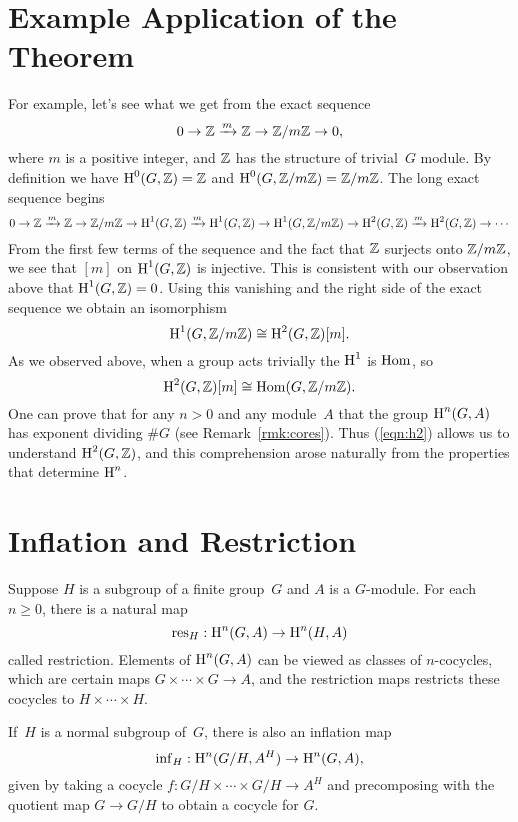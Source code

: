 \section{Example Application of the Theorem}
For example, let's see what we get from the exact sequence
$$
 0 \to \mathbb{Z} \xrightarrow{m} \mathbb{Z} \to \mathbb{Z}/m\mathbb{Z} \to 0,
$$
where $m$ is a positive integer, and $\mathbb{Z}$ has the structure of
trivial~$G$ module.  By definition we have
$\operatorname{H}^0(G,\mathbb{Z}) = \mathbb{Z}$ and $\operatorname{H}^0(G,\mathbb{Z}/m\mathbb{Z})=\mathbb{Z}/m\mathbb{Z}$.
The long exact sequence begins
$$
  0 \to \mathbb{Z} \xrightarrow{m} \mathbb{Z} \to \mathbb{Z}/m\mathbb{Z} \to \operatorname{H}^1(G,\mathbb{Z}) \xrightarrow{m}
\operatorname{H}^1(G,\mathbb{Z}) \to \operatorname{H}^1(G,\mathbb{Z}/m\mathbb{Z})\to
\operatorname{H}^2(G,\mathbb{Z}) \xrightarrow{m} \operatorname{H}^2(G,\mathbb{Z}) \to \cdots
$$
From the first few terms of the sequence and the fact
that $\mathbb{Z}$ surjects onto $\mathbb{Z}/m\mathbb{Z}$, we see that $[m]$
on $\operatorname{H}^1(G,\mathbb{Z})$ is injective.
This is consistent with our observation above that
$\operatorname{H}^1(G,\mathbb{Z}) = 0$. Using this vanishing and the right side of the
exact sequence we obtain an isomorphism
$$
\operatorname{H}^1(G,\mathbb{Z}/m\mathbb{Z}) \cong \operatorname{H}^2(G,\mathbb{Z})[m].
$$
As we observed above, when a group acts trivially the $\operatorname{H}^1$
is $\operatorname{Hom}$, so
\begin{equation}\label{eqn:h2}
  \operatorname{H}^2(G,\mathbb{Z})[m] \cong \operatorname{Hom}(G,\mathbb{Z}/m\mathbb{Z}).
\end{equation}
One can prove that for any $n>0$ and any module~$A$ that the group
$\operatorname{H}^n(G,A)$ has exponent dividing $\#G$ (see Remark~\ref{rmk:cores}).
Thus (\ref{eqn:h2}) allows
us to understand $\operatorname{H}^2(G,\mathbb{Z})$, and this comprehension arose
naturally from the properties that determine $\operatorname{H}^n$.



\section{Inflation and Restriction}
Suppose $H$ is a subgroup of a finite group~$G$ and $A$
is a $G$-module.  For each~$n\geq 0$, there is a natural map
$$
  \operatorname{res}_H : \operatorname{H}^n(G,A) \to \operatorname{H}^n(H,A)
$$
called restriction.  Elements of $\operatorname{H}^n(G,A)$ can be viewed as classes
of $n$-cocycles, which are certain maps $G \times \cdots \times G \to
A$, and the restriction maps  restricts these cocycles to $H
\times \cdots \times H$.

If~$H$ is a normal subgroup of~$G$, there is also an inflation map
$$
\operatorname{inf}_H: \operatorname{H}^n(G/H, A^H) \to \operatorname{H}^n(G,A),
$$
given by taking a cocycle $f : G/H \times \cdots \times G/H \to A^H$
and precomposing with the quotient map $G\to G/H$ to obtain a cocycle for $G$.

